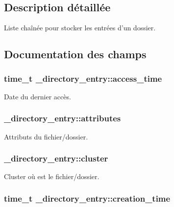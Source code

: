 \subsection{\-Description détaillée}
\-Liste chaînée pour stocker les entrées d'un dossier. 

\subsection{\-Documentation des champs}
\hypertarget{struct__directory__entry_a27e1020c5262094ab3b58759da9660ae}{
\subsubsection[{access\-\_\-time}]{\setlength{\rightskip}{0pt plus 5cm}time\-\_\-t {\bf \-\_\-directory\-\_\-entry\-::access\-\_\-time}}}\label{struct__directory__entry_a27e1020c5262094ab3b58759da9660ae}
\-Date du dernier accès. \hypertarget{struct__directory__entry_a63da8f87e73a3eb30e55b2d405fa35d7}{
\subsubsection[{attributes}]{ {\bf \-\_\-directory\-\_\-entry\-::attributes}}}\label{struct__directory__entry_a63da8f87e73a3eb30e55b2d405fa35d7}
\-Attributs du fichier/dossier. \hypertarget{struct__directory__entry_a8c70d9d0c2b2557cba83fb827d5c6e90}{
\subsubsection[{cluster}]{ {\bf \-\_\-directory\-\_\-entry\-::cluster}}}\label{struct__directory__entry_a8c70d9d0c2b2557cba83fb827d5c6e90}
\-Cluster où est le fichier/dossier. \hypertarget{struct__directory__entry_a95f0f5ef18bf17f332bd0dc352d62ac4}{
\subsubsection[{creation\-\_\-time}]{\setlength{\rightskip}{0pt plus 5cm}time\-\_\-t {\bf \-\_\-directory\-\_\-entry\-::creation\-\_\-time}}}\label{struct__directory__entry_a95f0f5ef18bf17f332bd0dc352d62ac4}

